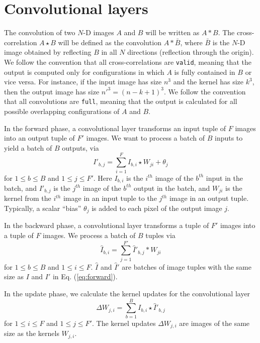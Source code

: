 \section{Convolutional layers} \label{sec-conv-layers}
  The convolution of two $N$-D images $A$ and $B$ will be written as
  $A*B$.  The cross-correlation $A\star B$ will be defined as the
  convolution $A\ast\bar{B}$, where $\bar{B}$ is the $N$-D
  image obtained by reflecting $B$ in all $N$ directions (reflection
  through the origin). We follow the convention that all
  cross-correlations are \texttt{valid}, meaning that the output is
  computed only for configurations in which $A$ is fully contained in
  $B$ or vice versa.  For instance, if the input image has size $n^3$
  and the kernel has size $k^3$, then the output image has size $n'^3
  = (n-k+1)^3$.  We follow the convention that all convolutions are
  \texttt{full}, meaning that the output is calculated for all
  possible overlapping configurations of $A$ and $B$.

  In the forward phase, a convolutional layer transforms an input
  tuple of $F$ images into an output tuple of $F'$ images.  We want to
  process a batch of $B$ inputs to yield a batch of $B$ outputs, via
  \begin{equation}\label{eq:forward}
  I'_{b,j} = \sum_{i=1}^F I_{b,i}\star W_{ji} + \theta_j
  \end{equation}
  for $1 \le b \le B$ and $1 \le j \le F'$.  Here $I_{b,i}$ is the
  $i^{th}$ image of the $b^{th}$ input in the batch, and $I'_{b,j}$ is
  the $j^{th}$ image of the $b^{th}$ output in the batch, and $W_{ji}$
  is the kernel from the $i^{th}$ image in an input tuple to the
  $j^{th}$ image in an output tuple.  Typically, a scalar ``bias''
  $\theta_j$ is added to each pixel of the output image $j$.

  In the backward phase, a convolutional layer transforms a tuple of
  $F'$ images into a tuple of $F$ images.  We process a batch of $B$
  tuples via
  \begin{equation}\label{eq:backward}
  \hat{I}_{b,i} = \sum_{j=1}^{F'} \hat{I}'_{b,j} \ast W_{ji}
  \end{equation}
  for $1 \le b \le B$ and $1 \le i \le F$.  $\hat{I}$ and $\hat{I}'$
  are batches of image tuples with the same size as $I$ and $I'$ in
  Eq. (\ref{eq:forward}).

  In the update phase, we calculate the kernel updates for the
  convolutional layer
  \begin{equation}\label{eq:update}
  \Delta W_{j,i} = \sum_{b=1}^B I_{b,i} \star \hat{I}'_{b,j}
  \end{equation}
  for $1 \le i \le F$ and $1 \le j \le F'$.  The kernel updates
  $\Delta W_{j,i}$ are images of the same size as the kernels
  $W_{j,i}$.


